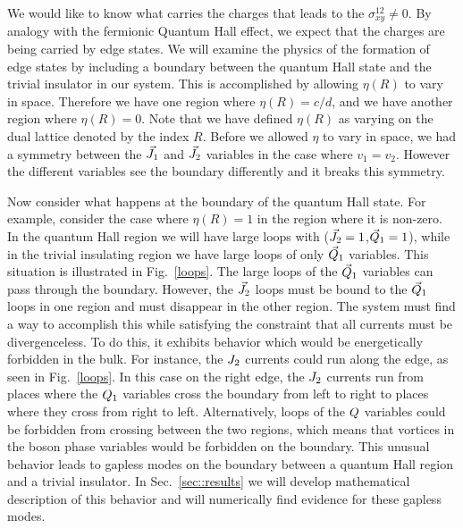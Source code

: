 We would like to know what carries the charges that leads to the $\sigma^{12}_{xy}\neq 0$. By analogy with the fermionic Quantum Hall effect, we expect that the charges are being carried by edge states. We will examine the physics of the formation of edge states by including a boundary between the quantum Hall state and the trivial insulator in our system.
This is accomplished by allowing $\eta(R)$ to vary in space. Therefore we have one region where $\eta(R)=c/d$, and we have another region where $\eta(R)=0$.  Note that we have defined $\eta(R)$ as varying on the dual lattice denoted by the index $R$. Before we allowed $\eta$ to vary in space, we had a symmetry between the $\vec{J}_1$ and $\vec{J}_2$ variables in the case where $v_1=v_2$. However the different variables see the boundary differently and it  breaks this symmetry.

Now consider what happens at the boundary of the quantum Hall state. For example, consider the case where $\eta(R)=1$ in the region where it is non-zero. In the quantum Hall region we will have large loops with ($\vec{J}_2=1$,$\vec{Q}_1=1$), while in the trivial insulating region we have large loops of only $\vec{Q}_1$ variables. This situation is illustrated in Fig.~\ref{loops}. The large loops of the $\vec{Q}_1$ variables can pass through the boundary. However, the $\vec{J}_2$ loops must be bound to the $\vec{Q}_1$ loops in one region and must disappear in the other region. The system must find a way to accomplish this while satisfying the constraint that all currents must be divergenceless. 
To do this, it exhibits behavior which would be energetically forbidden in the bulk. For instance, the $J_2$ currents could run along the edge, as seen in Fig.~\ref{loops}. In this case on the right edge, the $J_2$ currents run from places where the $Q_1$ variables cross the boundary from left to right to places where they cross from right to left. Alternatively, loops of the $Q$ variables could be forbidden from crossing between the two regions, which means that vortices in the boson phase variables would be forbidden on the boundary. This unusual behavior leads to gapless modes on the boundary between a quantum Hall region and a trivial insulator. In Sec.~\ref{sec::results} we will develop mathematical description of this behavior and will numerically find evidence for these gapless modes.

%

